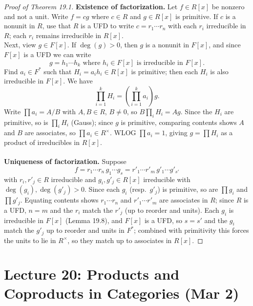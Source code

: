 \documentclass[a4paper,12pt]{article}
\begin{document}
\begin{proof}[Proof of Theorem 19.1]
    \textbf{Existence of factorization.} Let $f\in R[x]$ be nonzero and not a unit. Write $f=cg$ where $c\in R$ and $g\in R[x]$ is primitive. If $c$ is a nonunit in $R$, use that $R$ is a UFD to write $c=r_1\cdots r_n$ with each $r_i$ irreducible in $R$; each $r_i$ remains irreducible in $R[x]$. \\
    Next, view $g\in F[x]$. If $\deg(g)>0$, then $g$ is a nonunit in $F[x]$, and since $F[x]$ is a UFD we can write
    \[
    g=h_1\cdots h_k \text{ where } h_i\in F[x] \text{ is irreducible in } F[x].
    \]
    Find $a_i\in F^*$ such that $H_i=a_ih_i\in R[x]$ is primitive; then each $H_i$ is also irreducible in $F[x]$. We have
    \[
    \prod_{i=1}^k H_i=\left(\prod_{i=1}^k a_i\right) g.
    \]
    Write $\prod a_i=A/B$ with $A,B\in R$, $B\neq 0$, so $B\prod_i H_i=Ag$. Since the $H_i$ are primitive, so is $\prod_i H_i$ (Gauss); since $g$ is primitive, comparing contents shows $A$ and $B$ are associates, so $\prod a_i\in R^\times$. WLOG $\prod a_i=1$, giving $g=\prod H_i$ as a product of irreducibles in $R[x]$. \\\\
    \textbf{Uniqueness of factorization.} Suppose
    \[
    f=r_1\cdots r_n\, g_1\cdots g_s=r'_1\cdots r'_m\, g'_1\cdots g'_{s'}
    \]
    with $r_i,r'_j\in R$ irreducible and $g_i,g'_j\in R[x]$ irreducible with $\deg(g_i),\deg(g'_j)>0$. Since each $g_i$ (resp.\ $g'_j$) is primitive, so are $\prod g_i$ and $\prod g'_j$. Equating contents shows $r_1\cdots r_n$ and $r'_1\cdots r'_m$ are associates in $R$; since $R$ is a UFD, $n=m$ and the $r_i$ match the $r'_j$ (up to reorder and units). Each $g_i$ is irreducible in $F[x]$ (Lemma 19.8), and $F[x]$ is a UFD, so $s=s'$ and the $g_i$ match the $g'_j$ up to reorder and units in $F^*$; combined with primitivity this forces the units to lie in $R^\times$, so they match up to associates in $R[x]$.
\end{proof}
\newpage
\section{Lecture 20: Products and Coproducts in Categories (Mar 2)}
\end{document}
